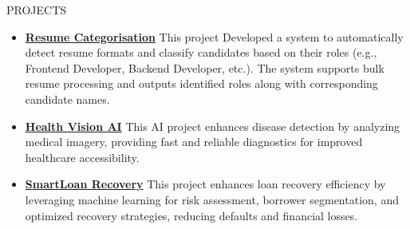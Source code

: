 \documentclass{resume}
\begin{document}
\vspace{-0.6em}
\begin{rSection}{PROJECTS}
    \begin{itemize}
        \item \textbf{\href{https://github.com}{Resume Categorisation}} {This project Developed a system to automatically detect resume formats and classify candidates based on their roles (e.g., Frontend Developer, Backend Developer, etc.). The system supports bulk resume processing and outputs identified roles along with corresponding candidate names.}
        \vspace{-0.2em}
        \item \textbf{\href{https://github.com}{Health Vision AI}} {This AI project enhances disease detection by analyzing medical imagery, providing fast and reliable diagnostics for improved healthcare accessibility.}
        \vspace{-0.2em}
        \item \textbf{\href{https://github.com}{SmartLoan Recovery}} {This project enhances loan recovery efficiency by leveraging machine learning for risk assessment, borrower segmentation, and optimized recovery strategies, reducing defaults and financial losses.}
        \vspace{-0.2em}
    \end{itemize}
\end{rSection}
\vspace{-0.4em}
\end{document}
